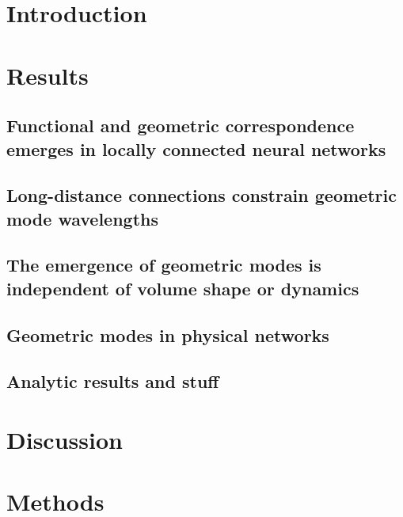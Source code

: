 \documentclass{article}
\begin{document}
\begin{multicols}{2}

\section*{Introduction}

\section*{Results}

\subsection*{Functional and geometric correspondence emerges in locally connected neural networks}

\subsection*{Long-distance connections constrain geometric mode wavelengths}

\subsection*{The emergence of geometric modes is independent of volume shape or dynamics}

\subsection*{Geometric modes in physical networks}

\subsection*{Analytic results and stuff}

\begin{figure*}[t!]
    \centering
    \caption{}
    \label{fig1}
\end{figure*}

\section*{Discussion}


\section*{Methods}



\end{multicols}
\end{document}
